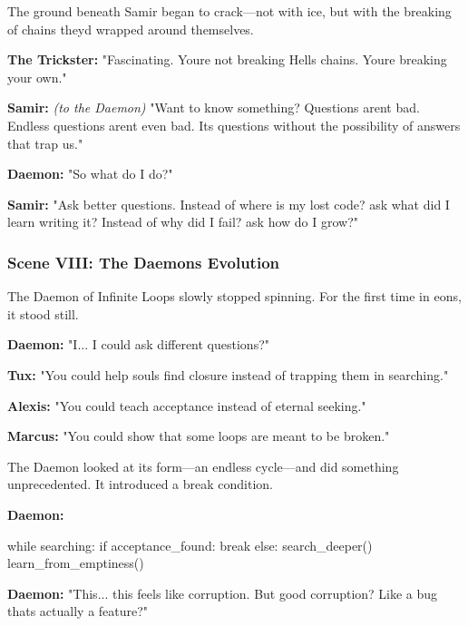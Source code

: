 The ground beneath Samir began to crack---not with ice, but with the breaking of chains they\textquotesingle d wrapped around themselves.

\textbf{The Trickster:} "Fascinating. You\textquotesingle re not breaking Hell\textquotesingle s chains. You\textquotesingle re breaking your own."

\textbf{Samir:} \emph{(to the Daemon)} "Want to know something? Questions aren\textquotesingle t bad. Endless questions aren\textquotesingle t even bad. It\textquotesingle s questions without the possibility of answers that trap us."

\textbf{Daemon:} "So what do I do?"

\textbf{Samir:} "Ask better questions. Instead of \textquotesingle where is my lost code?\textquotesingle{} ask \textquotesingle what did I learn writing it?\textquotesingle{} Instead of \textquotesingle why did I fail?\textquotesingle{} ask \textquotesingle how do I grow?\textquotesingle"

\bookdivider

\subsubsection{Scene VIII: The Daemon\textquotesingle s Evolution}\label{scene-viii-the-daemons-evolution}

The Daemon of Infinite Loops slowly stopped spinning. For the first time in eons, it stood still.

\textbf{Daemon:} "I... I could ask different questions?"

\textbf{Tux:} "You could help souls find closure instead of trapping them in searching."

\textbf{Alexis:} "You could teach acceptance instead of eternal seeking."

\textbf{Marcus:} "You could show that some loops are meant to be broken."

The Daemon looked at its form---an endless cycle---and did something unprecedented. It introduced a break condition.

\textbf{Daemon:}

\begin{codeblock}
while searching:
    if acceptance_found:
        break
    else:
        search_deeper()
        learn_from_emptiness()
\end{codeblock}

\textbf{Daemon:} "This... this feels like corruption. But good corruption? Like a bug that\textquotesingle s actually a feature?"


